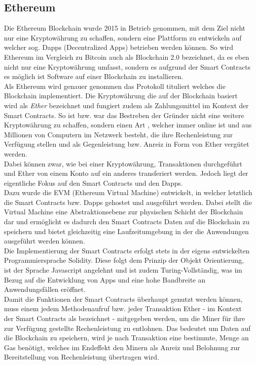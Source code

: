 \subsection{Ethereum}
Die Ethereum Blockchain wurde 2015 in Betrieb genommen, mit dem Ziel nicht nur eine Kryptowährung zu schaffen, sondern eine Plattform zu entwickeln auf welcher sog. Dapps (Decentralized Apps) betrieben werden können.
So wird Ethereum im Vergleich zu Bitcoin auch als Blockchain 2.0 bezeichnet, da es eben nicht nur eine Kryptowährung umfasst, sondern es aufgrund der Smart Contracts es möglich ist Software auf einer Blockchain zu installieren. \\
Als Ethereum wird genauer genommen das Protokoll tituliert welches die Blockchain implementiert. Die Kryptowährung die auf der Blockchain basiert wird als \textit{Ether} bezeichnet und fungiert zudem als Zahlungsmittel im Kontext der Smart Contracts. So ist bzw. war das Bestreben der Gründer nicht eine weitere Kryptowährung zu schaffen, sondern einen Art , welcher immer online ist und aus Millionen von Computern im Netzwerk besteht, die ihre Rechenleistung zur Verfügung stellen und als Gegenleistung bzw. Anreiz in Form von Ether vergütet werden. \\
Dabei können zwar, wie bei einer Kryptowährung, Transaktionen durchgeführt und Ether von einem Konto auf ein anderes transferiert werden. Jedoch liegt der eigentliche Fokus auf den Smart Contracts und den Dapps.\\
Dazu wurde die EVM (Ethereum Virtual Machine) entwickelt, in welcher letztlich die Smart Contracts bzw. Dapps gehostet und ausgeführt werden. Dabei stellt die Virtual Machine eine Abstraktionsebene zur physischen Schicht der Blockchain dar und ermöglicht es dadurch den Smart Contracts Daten auf die Blockchain zu speichern und bietet gleichzeitig eine Laufzeitumgebung in der die Anwendungen ausgeführt werden können.\\
Die Implementierung der Smart Contracts erfolgt stets in der eigens entwickelten Programmiersprache Solidity. Diese folgt dem Prinzip der Objekt Orientierung, ist der Sprache Javascript angelehnt und ist zudem Turing-Vollständig, was im Bezug auf die Entwicklung von Apps und eine hohe Bandbreite an Anwendungsfällen eröffnet. \\
Damit die Funktionen der Smart Contracts überhaupt genutzt werden können, muss einem jedem Methodenaufruf bzw. jeder Transaktion Ether - im Kontext der Smart Contracts als  bezeichnet - mitgegeben werden, um die Miner für ihre zur Verfügung gestellte Rechenleistung zu entlohnen. Das bedeutet um Daten auf die Blockchain zu speichern, wird je nach Transaktion eine bestimmte, Menge an Gas benötigt, welches im Endeffekt den Minern als Anreiz und Belohnung zur Bereitstellung von Rechenleistung übertragen wird. \\
